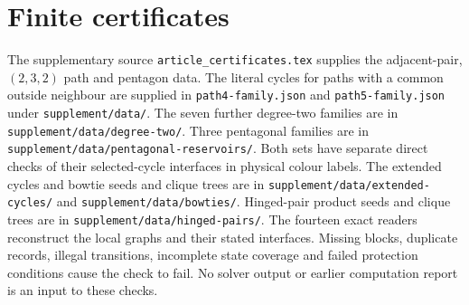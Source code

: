 \documentclass[11pt]{article}
\theoremstyle{remark}
\numberwithin{equation}{section}
\numberwithin{table}{section}
\begin{document}
\section{Finite certificates}
\label{sec:verification}

The supplementary source \texttt{article\_certificates.tex} supplies the
adjacent-pair, $(2,3,2)$ path and pentagon data. The literal cycles for
paths with a common outside neighbour are supplied in
\texttt{path4-family.json} and \texttt{path5-family.json} under
\texttt{supplement/data/}. The seven further degree-two families are in
\texttt{supplement/data/degree-two/}. Three pentagonal families are in
\texttt{supplement/data/pentagonal-reservoirs/}. Both sets have separate
direct checks of their selected-cycle interfaces in physical colour labels.
The extended cycles and bowtie seeds and clique trees are in
\texttt{supplement/data/extended-cycles/} and
\texttt{supplement/data/bowties/}. Hinged-pair product seeds and clique
trees are in \texttt{supplement/data/hinged-pairs/}.
The fourteen exact
readers reconstruct the local graphs and their stated interfaces.
Missing blocks, duplicate records, illegal transitions,
incomplete state coverage and failed protection conditions cause the
check to fail. No solver output or earlier computation report is an
input to these checks.
\end{document}
